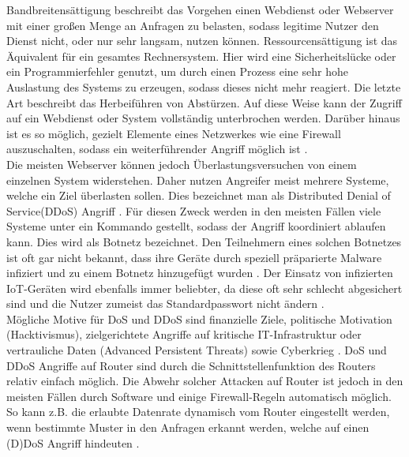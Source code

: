 \documentclass[a4paper]{book}
\begin{document}
\begin{large}
\begin{onehalfspace}
\noindent Bandbreitensättigung beschreibt das Vorgehen einen Webdienst oder Webserver mit einer großen Menge an Anfragen zu belasten, sodass legitime Nutzer den Dienst nicht, oder nur sehr langsam, nutzen können. Ressourcensättigung ist das Äquivalent für ein gesamtes Rechnersystem. Hier wird eine Sicherheitslücke oder ein Programmierfehler genutzt, um durch einen Prozess eine sehr hohe Auslastung des Systems zu erzeugen, sodass dieses nicht mehr reagiert. Die letzte Art beschreibt das Herbeiführen von Abstürzen. Auf diese Weise kann der Zugriff auf ein Webdienst oder System vollständig unterbrochen werden. Darüber hinaus ist es so möglich, gezielt Elemente eines Netzwerkes wie eine Firewall auszuschalten, sodass ein weiterführender Angriff möglich ist \cite{BundesamtfurSicherheitinderInformationstechnik.2020}.\\
\indent Die meisten Webserver können jedoch Überlastungsversuchen von einem einzelnen System widerstehen. Daher nutzen Angreifer meist mehrere Systeme, welche ein Ziel überlasten sollen. Dies bezeichnet man als \glqq Distributed Denial of Service\grqq{}(DDoS) Angriff \cite[p.~210]{Fischer.2011}. Für diesen Zweck werden in den meisten Fällen viele Systeme unter ein Kommando gestellt, sodass der Angriff koordiniert ablaufen kann. Dies wird als \glqq Botnetz\grqq{} bezeichnet. Den Teilnehmern eines solchen Botnetzes ist oft gar nicht bekannt, dass ihre Geräte durch speziell präparierte Malware infiziert und zu einem Botnetz hinzugefügt wurden \cite{StephenHilt.2020}. Der Einsatz von infizierten IoT-Geräten wird ebenfalls immer beliebter, da diese oft sehr schlecht abgesichert sind und die Nutzer zumeist das Standardpasswort nicht ändern \cite{BSI.2016}.\\
\indent Mögliche Motive für DoS und DDoS sind finanzielle Ziele, politische Motivation (\glqq Hacktivismus\grqq ), zielgerichtete Angriffe auf kritische IT-Infrastruktur oder vertrauliche Daten (\glqq Advanced Persistent Threats\grqq ) sowie Cyberkrieg \cite[p.~12]{radware.2015} \cite{BundesamtfurSicherheitinderInformationstechnik.2020}. DoS und DDoS Angriffe auf Router sind durch die Schnittstellenfunktion des Routers relativ einfach möglich. Die Abwehr solcher Attacken auf Router ist jedoch in den meisten Fällen durch Software und einige Firewall-Regeln automatisch möglich. So kann z.B. die erlaubte Datenrate dynamisch vom Router eingestellt werden, wenn bestimmte Muster in den Anfragen erkannt werden, welche auf einen (D)DoS Angriff hindeuten \cite{StefanoAlbrecht.2005}.




\end{onehalfspace}
\end{large}
\end{document}

